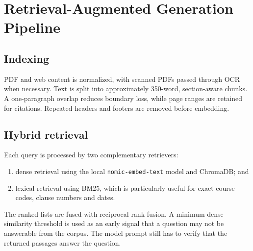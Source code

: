 \documentclass[11pt,a4paper]{article}
\begin{document}
\section{Retrieval-Augmented Generation Pipeline}
\label{sec:rag}

\subsection{Indexing}
PDF and web content is normalized, with scanned PDFs passed through OCR when necessary. Text is split into approximately 350-word, section-aware chunks. A one-paragraph overlap reduces boundary loss, while page ranges are retained for citations. Repeated headers and footers are removed before embedding.

\subsection{Hybrid retrieval}
Each query is processed by two complementary retrievers:
\begin{enumerate}[leftmargin=*]
  \item dense retrieval using the local \texttt{nomic-embed-text} model and ChromaDB; and
  \item lexical retrieval using BM25, which is particularly useful for exact course codes, clause numbers and dates.
\end{enumerate}
The ranked lists are fused with reciprocal rank fusion. A minimum dense similarity threshold is used as an early signal that a question may not be answerable from the corpus. The model prompt still has to verify that the returned passages answer the question.
\end{document}
